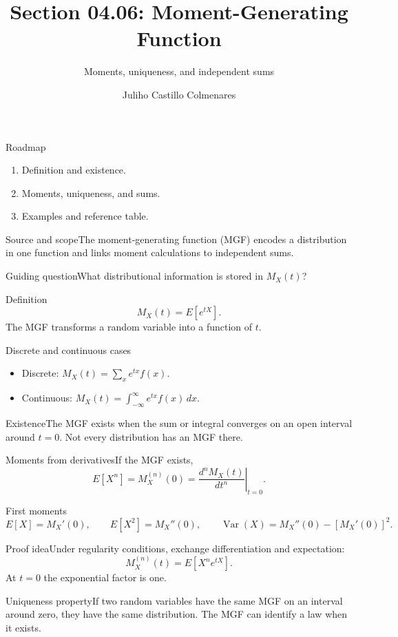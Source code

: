 \documentclass[10pt,aspectratio=169]{beamer}
\title[Moment-generating function]{Section 04.06: Moment-Generating Function}\subtitle{Moments, uniqueness, and independent sums}\author[J. Castillo Colmenares]{Juliho Castillo Colmenares}\institute{Tecnológico de Monterrey}\date{}
\begin{document}
\begin{frame}[plain]\titlepage\end{frame}
\begin{frame}{Roadmap}\small\begin{enumerate}\item Definition and existence.\item Moments, uniqueness, and sums.\item Examples and reference table.\end{enumerate}\end{frame}
\begin{frame}{Source and scope}\small The moment-generating function (MGF) encodes a distribution in one function and links moment calculations to independent sums.\begin{block}{Guiding question}What distributional information is stored in $M_X(t)$?\end{block}\end{frame}
\begin{frame}{Definition}\small\[M_X(t)=E[e^{tX}].\]The MGF transforms a random variable into a function of $t$.\end{frame}
\begin{frame}{Discrete and continuous cases}\small\begin{itemize}\item Discrete: $M_X(t)=\sum_x e^{tx}f(x)$.\item Continuous: $M_X(t)=\int_{-\infty}^{\infty}e^{tx}f(x)\,dx$.\end{itemize}\end{frame}
\begin{frame}{Existence}\small The MGF exists when the sum or integral converges on an open interval around $t=0$. Not every distribution has an MGF there.\end{frame}
\begin{frame}{Moments from derivatives}\small If the MGF exists,\[E[X^n]=M_X^{(n)}(0)=\left.\frac{d^nM_X(t)}{dt^n}\right|_{t=0}.\]\end{frame}
\begin{frame}{First moments}\small\[E[X]=M_X'(0),\qquad E[X^2]=M_X''(0),\qquad\operatorname{Var}(X)=M_X''(0)-[M_X'(0)]^2.\]\end{frame}
\begin{frame}{Proof idea}\small Under regularity conditions, exchange differentiation and expectation:\[M_X^{(n)}(t)=E[X^ne^{tX}].\]At $t=0$ the exponential factor is one.\end{frame}
\begin{frame}{Uniqueness property}\small If two random variables have the same MGF on an interval around zero, they have the same distribution. The MGF can identify a law when it exists.\end{frame}
\end{document}
